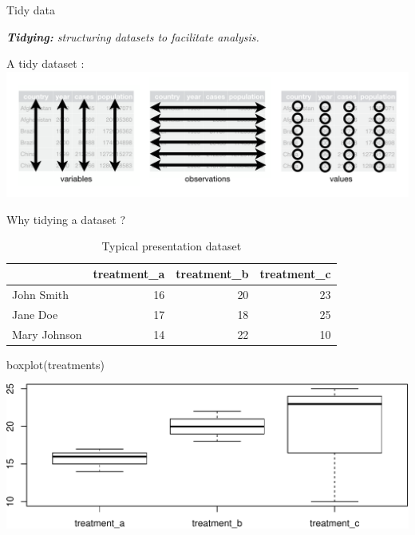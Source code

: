 \documentclass[14pt,ignorenonframetext,]{bredelebeamer}
\newenvironment{Shaded}{\begin{snugshade}}{\end{snugshade}}
\newcommand{\KeywordTok}[1]{\textcolor[rgb]{0.94,0.87,0.69}{#1}}
\newcommand{\NormalTok}[1]{\textcolor[rgb]{0.80,0.80,0.80}{#1}}
\begin{document}
\begin{frame}{Tidy data}

\begin{Large}
\textit{\textbf{Tidying:} structuring datasets to facilitate analysis.}
\end{Large}\begin{center}
A tidy dataset :\\
\includegraphics{images/tidy-1.png}

\end{center}

\end{frame}

\begin{frame}[fragile]{Why tidying a dataset ?}

\begin{center}
\begin{table}[t]

\caption{\label{tab:show1}Typical presentation dataset}
\centering
\begin{tabular}{l|r|r|r}
\hline
  & treatment\_a & treatment\_b & treatment\_c\\
\hline
John Smith & 16 & 20 & 23\\
\hline
Jane Doe & 17 & 18 & 25\\
\hline
Mary Johnson & 14 & 22 & 10\\
\hline
\end{tabular}
\end{table}
\end{center}

\begin{Shaded}
\begin{Highlighting}[]
\KeywordTok{boxplot}\NormalTok{(treatments)}
\end{Highlighting}
\end{Shaded}

\includegraphics{tidyverse_28_03_files/figure-beamer/boxplot1-1.pdf}

\end{frame}
\end{document}
